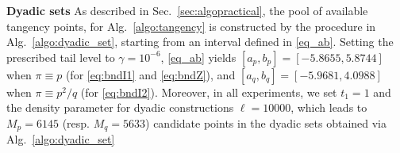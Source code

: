 \documentclass[review]{elsarticle}
\begin{document}
\noindent\textbf{Dyadic sets}  
 As described in Sec.~\ref{sec:algopractical}, the pool of available tangency points, for Alg.~\ref{algo:tangency} is constructed by the procedure in Alg.~\ref{algo:dyadic_set}, starting from an interval defined in \eqref{eq_ab}. Setting the prescribed tail level to $\gamma = 10^{-6}$, \eqref{eq_ab} yields $[a_p,b_p] = [-5.8655,5.8744]$ when $\pi \equiv p$ (for \eqref{eq:bndI1} and \eqref{eq:bndZ}), and $[a_q,b_q] = [-5.9681,4.0988]$ when $\pi \equiv p^2/q$ (for \eqref{eq:bndI2}). Moreover, in all experiments, we set {$t_1 = 1$ and the density parameter for dyadic constructions $\ell = 10000$, which leads to $M_p = 6145$ (resp. $M_q = 5633$) candidate points in the dyadic sets obtained via Alg.~\ref{algo:dyadic_set}}




\end{document}
